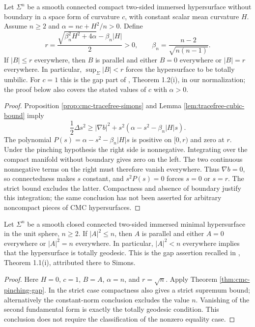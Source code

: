 \begin{theorem}\label{thm:cmc-pinching-gap}
Let $\Sigma^n$ be a smooth connected compact two-sided immersed hypersurface without boundary in a space form of curvature $c$, with constant scalar mean curvature $H$. Assume $n\geq2$ and $\alpha=nc+H^2/n>0$. Define
\[
 r=\frac{\sqrt{\beta_n^2H^2+4\alpha}-\beta_n|H|}{2}>0,
 \qquad \beta_n=\frac{n-2}{\sqrt{n(n-1)}}.
\]
If $|B|\leq r$ everywhere, then $B$ is parallel and either $B=0$ everywhere or $|B|=r$ everywhere. In particular, $\sup_\Sigma|B|<r$ forces the hypersurface to be totally umbilic. For $c=1$ this is the gap part of \cite{AdC94}, Theorem 1.2(i), in our normalization; the proof below also covers the stated values of $c$ with $\alpha>0$.
\end{theorem}
\begin{proof}
Proposition \ref{prop:cmc-tracefree-simons} and Lemma \ref{lem:tracefree-cubic-bound} imply
\[
 \frac12\Delta s^2\geq|\nabla b|^2+s^2(\alpha-s^2-\beta_n|H|s).
\]
The polynomial $P(s)=\alpha-s^2-\beta_n|H|s$ is positive on $[0,r)$ and zero at $r$. Under the pinching hypothesis the right side is nonnegative. Integrating over the compact manifold without boundary gives zero on the left. The two continuous nonnegative terms on the right must therefore vanish everywhere. Thus $\nabla b=0$, so connectedness makes $s$ constant, and $s^2P(s)=0$ forces $s=0$ or $s=r$. The strict bound excludes the latter. Compactness and absence of boundary justify this integration; the same conclusion has not been asserted for arbitrary noncompact pieces of CMC hypersurfaces.
\end{proof}

\begin{corollary}\label{cor:minimal-sphere-curvature-gap}
Let $\Sigma^n$ be a smooth closed connected two-sided immersed minimal hypersurface in the unit sphere, $n\geq2$. If $|A|^2\leq n$, then $A$ is parallel and either $A=0$ everywhere or $|A|^2=n$ everywhere. In particular, $|A|^2<n$ everywhere implies that the hypersurface is totally geodesic. This is the gap assertion recalled in \cite{AdC94}, Theorem 1.1(i), attributed there to Simons.
\end{corollary}
\begin{proof}
Here $H=0$, $c=1$, $B=A$, $\alpha=n$, and $r=\sqrt n$. Apply Theorem \ref{thm:cmc-pinching-gap}. In the strict case compactness also gives a strict supremum bound; alternatively the constant-norm conclusion excludes the value $n$. Vanishing of the second fundamental form is exactly the totally geodesic condition. This conclusion does not require the classification of the nonzero equality case.
\end{proof}

